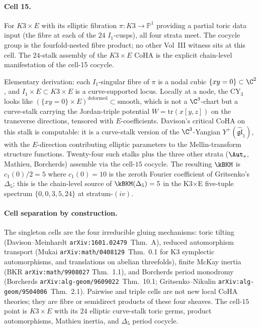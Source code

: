 \paragraph{Cell 15.} For $K3\times E$ with its elliptic fibration
$\pi:K3\to\mathbb{P}^{1}$ providing a partial toric data input (the
fibre at each of the $24$ $I_{1}$-cusps), all four strata meet. The
cocycle group is the fourfold-nested fibre product; no other Vol~III
witness sits at this cell. The $24$-stalk assembly of the $K3\times E$
CoHA is the explicit chain-level manifestation of the cell-15 cocycle.

Elementary derivation: each $I_{1}$-singular fibre of $\pi$ is a
nodal cubic $\{xy=0\}\subset\C^{2}$, and $I_{1}\times E\subset
K3\times E$ is a curve-supported locus. Locally at a node, the CY$_3$
looks like $(\{xy=0\}\times E)^{\mathrm{deformed}}\subset\mathrm{smooth}$,
which is not a $\C^{3}$-chart but a curve-stalk carrying the
Jordan-triple potential $W=\mathrm{tr}(x[y,z])$ on the transverse
directions, tensored with $E$-coefficients. Davison's critical CoHA
on this stalk is computable: it is a curve-stalk version of the
$\C^{3}$-Yangian $Y^{+}(\widehat{\mathfrak{gl}}_{1})$, with the
$E$-direction contributing elliptic parameters to the Mellin-transform
structure functions. Twenty-four such stalks plus the three other
strata ($\Aut_{s}$, Mathieu, Borcherds) assemble via the cell-$15$ cocycle.
The resulting $\kBKM$ is $c_{1}(0)/2=5$ where $c_{1}(0)=10$ is the
zeroth Fourier coefficient of Gritsenko's $\Delta_{5}$; this is the
chain-level source of $\kBKM(\Delta_{5})=5$ in the
K3$\times$E five-tuple spectrum $\{0,0,3,5,24\}$ at stratum-$(iv)$.

\paragraph{Cell separation by construction.} The singleton cells are
the four irreducible gluing mechanisms: toric tilting
(Davison--Meinhardt \texttt{arXiv:1601.02479}~Thm.~A), reduced
automorphism transport (Mukai \texttt{arXiv:math/0408129}~Thm.~0.1
for K3 symplectic automorphisms, and translations on abelian
threefolds), finite McKay inertia (BKR \texttt{arXiv:math/9908027}
Thm.~1.1), and Borcherds period monodromy
(Borcherds \texttt{arXiv:alg-geom/9609022}~Thm.~10.1;
Gritsenko--Nikulin \texttt{arXiv:alg-geom/9504006}~Thm.~2.1). Pairwise
and triple cells are not new local CoHA theories; they are fibre or
semidirect products of these four sheaves. The cell-$15$ point is
\(K3\times E\) with its \(24\) elliptic curve-stalk toric germs,
product automorphisms, Mathieu inertia, and \(\Delta_5\) period
cocycle.

